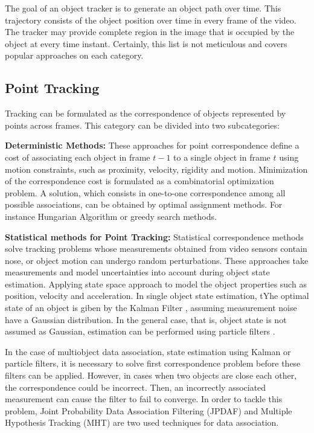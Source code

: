 The goal of an object tracker is to generate an object path over time. This trajectory consists of the object position over time in every frame of the video. The tracker may provide complete region in the image that is occupied by the object at every time instant. Certainly, this list is not meticulous and covers popular approaches on each category.

\subsection{Point Tracking}

Tracking can be formulated as the correspondence of objects represented by points across frames. This category can be divided into two subcategories:

\textbf{Deterministic Methods: } These approaches for point correspondence define a cost of associating each object in frame $t-1$ to a single object in frame $t$ using motion constraints, such as proximity, velocity, rigidity and motion. Minimization of the correspondence cost is formulated as a combinatorial optimization problem. A solution, which consists in one-to-one correspondence among all possible associations, can be obtained by optimal assignment methods. For instance Hungarian Algorithm \cite{Qin2012} or greedy search methods.

\textbf{Statistical methods for Point Tracking: } Statistical correspondence methods solve tracking problems whose measurements obtained from video sensors contain nose, or object motion can undergo random perturbations. These approaches take measurements and model uncertainties into account during object state estimation. Applying state space approach to model the object properties such as position, velocity and acceleration. In single object state estimation, tYhe optimal state of an object is giben by the Kalman Filter \cite{Ren2008a,Heikkila2004}, assuming measurement noise have a Gaussian distribution. In the general case, that is, object state is not assumed as Gaussian, estimation can be performed using particle filters \cite{Okuma2004,Rittscher2000}.

In the case of multiobject data association, state estimation using Kalman or particle filters, it is necessary to solve first correspondence problem before these filters can be applied. However, in cases when two objects are close each other, the correspondence could be incorrect. Then, an incorrectly associated measurement can cause the filter to fail to converge. In order to tackle this problem, Joint Probability Data Association Filtering (JPDAF) \cite{Schulz2003} and Multiple Hypothesis Tracking (MHT) \cite{Zulkifley2012} are two used techniques for data association.

